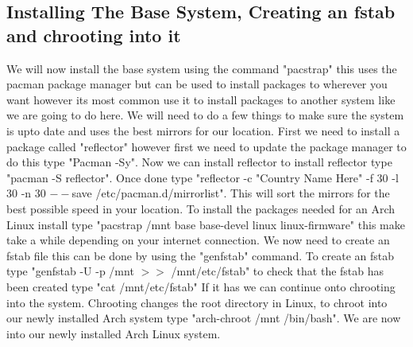 \documentclass[titlepage]{article}
\begin{document}
   \subsection{Installing The Base System, Creating an fstab and chrooting into it}
  We will now install the base system using the command "pacstrap" this uses the pacman package manager but can be used to install packages to wherever you want however its most common use it to install packages to another system like we are going to do here. We will need to do a few things to make sure the system is upto date and uses the best mirrors for our location. First we need to install a package called "reflector" however first we need to update the package manager to do this type "Pacman -Sy". Now we can install reflector to install reflector type "pacman -S reflector". Once done type "reflector -c "Country Name Here" -f 30 -l 30 -n 30 $--$save /etc/pacman.d/mirrorlist". This will sort the mirrors for the best possible speed in your location. To install the packages needed for an Arch Linux install type "pacstrap /mnt base base-devel linux linux-firmware" this make take a while depending on your internet connection. We now need to create an fstab file this can be done by using the "genfstab" command. To create an fstab type "genfstab -U -p /mnt $>$$>$ /mnt/etc/fstab" to check that the fstab has been created type "cat /mnt/etc/fstab" If it has we can continue onto chrooting into the system. Chrooting changes the root directory
  in Linux, to chroot into our newly installed Arch system type "arch-chroot /mnt /bin/bash". We are now into our newly installed Arch Linux system.
  \vspace*{0.5 cm}
\end{document}
